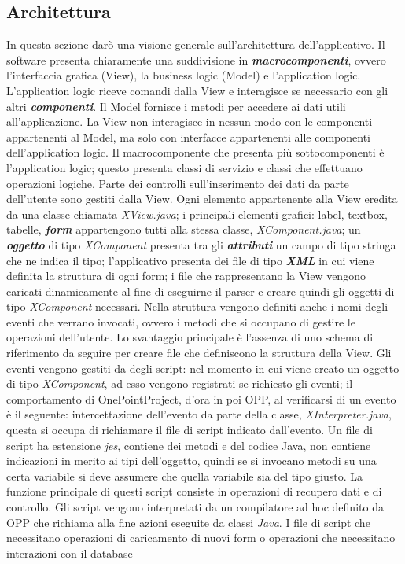 \subsection{Architettura}
In questa sezione dar\`{o} una visione generale sull\textquoteright{}architettura dell\textquoteright{}applicativo. Il software presenta chiaramente una suddivisione in \textit{\textbf{macrocomponenti}}, ovvero l\textquoteright{}interfaccia grafica (View), la business logic (Model) e l\textquoteright{}application logic. L\textquoteright{}application logic riceve comandi dalla View e interagisce se necessario con gli altri \textit{\textbf{componenti}}. Il Model fornisce i metodi per accedere ai dati utili all\textquoteright{}applicazione. La View non interagisce in nessun modo con le componenti appartenenti al Model, ma solo con interfacce appartenenti alle componenti dell\textquoteright{}application logic. Il macrocomponente che presenta pi\`{u} sottocomponenti \`{e} l\textquoteright{}application logic; questo presenta classi di servizio e classi che effettuano operazioni logiche. Parte dei controlli sull\textquoteright{}inserimento dei dati da parte dell\textquoteright{}utente sono gestiti dalla View. Ogni elemento appartenente alla View eredita da una classe chiamata \textit{XView.java}; i principali elementi grafici: label, textbox, tabelle, \textit{\textbf{form}} appartengono tutti alla stessa classe, \textit{XComponent.java}; un \textit{\textbf{oggetto}} di tipo \textit{XComponent} presenta tra gli \textit{\textbf{attributi}} un campo di tipo stringa che ne indica il tipo; l\textquoteright{}applicativo presenta dei file di tipo \textit{\textbf{XML}} in cui viene definita la struttura di ogni form; i file che rappresentano la View vengono caricati dinamicamente al fine di eseguirne il parser e creare quindi gli oggetti di tipo \textit{XComponent} necessari. Nella struttura vengono definiti anche i nomi degli eventi che verrano invocati, ovvero i metodi che si occupano di gestire le operazioni dell\textquoteright{}utente. Lo svantaggio principale \`{e} l\textquoteright{}assenza di uno schema di riferimento da seguire per creare file che definiscono la struttura della View. Gli eventi vengono gestiti da degli script: nel momento in cui viene creato un oggetto di tipo \textit{XComponent}, ad esso vengono registrati se richiesto gli eventi; il comportamento di OnePointProject, d'ora in poi OPP, al verificarsi di un evento \`{e} il seguente: intercettazione dell\textquoteright{}evento da parte della classe, \textit{XInterpreter.java}, questa si occupa di richiamare il file di script indicato dall\textquoteright{}evento. Un file di script ha estensione \textit{jes}, contiene dei metodi e del codice Java, non contiene indicazioni in merito ai tipi dell\textquoteright{}oggetto, quindi se si invocano metodi su una certa variabile si deve assumere che quella variabile sia del tipo giusto. La funzione principale di questi script consiste in operazioni di recupero dati e di controllo. Gli script vengono interpretati da un compilatore ad hoc definito da OPP che richiama alla fine azioni eseguite da classi \textit{Java}. I file di script che necessitano operazioni di caricamento di nuovi form o operazioni che necessitano interazioni con il database 